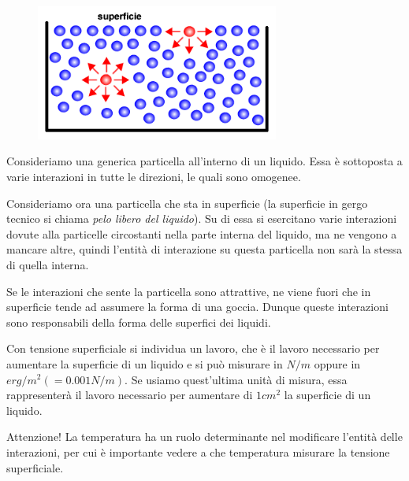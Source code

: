 \begin{figure}[htp]
   \centering
   \includegraphics[width=8cm]{immagini/tensione_superficiale.png}
\end{figure}

Consideriamo una generica particella all'interno di un liquido. Essa è sottoposta a varie interazioni in tutte le direzioni, le quali sono omogenee. 
   
Consideriamo ora una particella che sta in superficie (la superficie in gergo tecnico si chiama \textit{pelo libero del liquido}). Su di essa si esercitano varie interazioni dovute alla particelle circostanti nella parte interna del liquido, ma ne vengono a mancare altre, quindi l'entità di interazione su questa particella non sarà la stessa di quella interna.

Se le interazioni che sente la particella sono attrattive, ne viene fuori che in superficie tende ad assumere la forma di una goccia. Dunque queste interazioni sono responsabili della forma delle superfici dei liquidi.

Con tensione superficiale si individua un lavoro, che è il lavoro necessario per aumentare la superficie di un liquido e si può misurare in $N/m$ oppure in $erg/m^2(=0.001N/m)$. Se usiamo quest'ultima unità di misura, essa rappresenterà il lavoro necessario per aumentare di $1cm^2$  la superficie di un liquido.

Attenzione! La temperatura ha un ruolo determinante nel modificare l'entità delle interazioni, per cui è importante vedere a che temperatura misurare la tensione superficiale.

